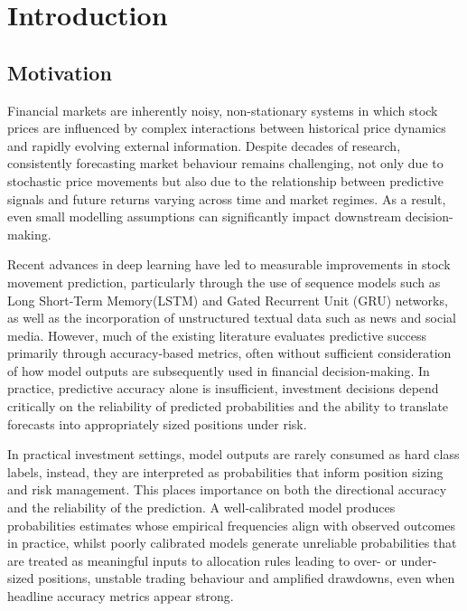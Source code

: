 \documentclass{l4proj}
\begin{document}
\chapter{Introduction}




\section{Motivation}
Financial markets are inherently noisy, non-stationary systems in which stock prices are influenced by complex interactions between historical price dynamics and rapidly evolving external information. Despite decades of research, consistently forecasting market behaviour remains challenging, not only due to stochastic price movements but also due to the relationship between predictive signals and future returns varying across time and market regimes. As a result, even small modelling assumptions can significantly impact downstream decision-making.

Recent advances in deep learning have led to measurable improvements in stock movement prediction, particularly through the use of sequence models such as Long Short-Term Memory(LSTM) and Gated Recurrent Unit (GRU) networks, as well as the incorporation of unstructured textual data such as news and social media. However, much of the existing literature evaluates predictive success primarily through accuracy-based metrics, often without sufficient consideration of how model outputs are subsequently used in financial decision-making. In practice, predictive accuracy alone is insufficient, investment decisions depend critically on the reliability of predicted probabilities and the ability to translate forecasts into appropriately sized positions under risk.

In practical investment settings, model outputs are rarely consumed as hard class labels, instead, they are interpreted as probabilities that inform position sizing and risk management. This places importance on both the directional accuracy and the reliability of the prediction. A well-calibrated model produces probabilities estimates whose empirical frequencies align with observed outcomes in practice, whilst poorly calibrated models generate unreliable probabilities that are treated as meaningful inputs to allocation rules leading to over- or under-sized positions, unstable trading behaviour and amplified drawdowns, even when headline accuracy metrics appear strong.
\end{document}
